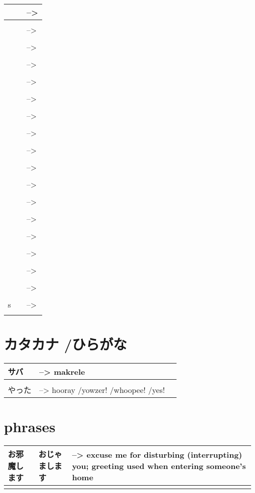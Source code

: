 \documentclass{article}
\begin{document}
\begin{tabular}{ l | l l }
    &   &-->    \\ \hline\\[-1em]
    &   &-->    \\ \hline\\[-1em]
    &   &-->    \\ \hline\\[-1em]
    &   &-->    \\ \hline\\[-1em]
    &   &-->    \\ \hline\\[-1em]
    &   &-->    \\ \hline\\[-1em]
    &   &-->    \\ \hline\\[-1em]
    &   &-->    \\ \hline\\[-1em]
    &   &-->    \\ \hline\\[-1em]
    &   &-->    \\ \hline\\[-1em]
    &   &-->    \\ \hline\\[-1em]
    &   &-->    \\ \hline\\[-1em]
    &   &-->    \\ \hline\\[-1em]
    &   &-->    \\ \hline\\[-1em]
    &   &-->    \\ \hline\\[-1em]
    &   &-->    \\ \hline\\[-1em]
    &   &-->    \\ \hline\\[-1em]
s    &   &-->    \\ \hline\\[-1em]
\end{tabular}

\part*{カタカナ /ひらがな}
\begin{tabular}{ p{3cm} | l l }
サバ    &--> makrele \\ \hline\\[-1em]
やった  &--> hooray /yowzer! /whoopee! /yes!
\end{tabular}

\part*{phrases}
\begin{tabular}{ l | l p{12cm} }
お邪魔します    &おじゃまします     &--> excuse me for disturbing (interrupting) you; greeting used when entering someone's home \\ \hline\\[-1em]
\end{tabular}
\end{document}
